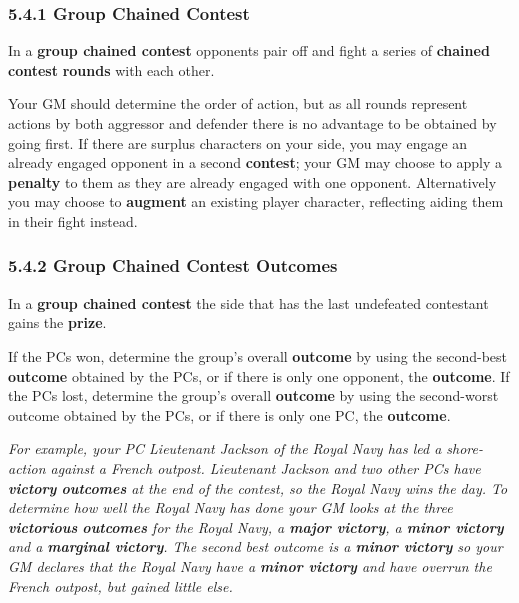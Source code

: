 \documentclass[
]{article}
\begin{document}
\hypertarget{group-chained-contest}{%
\subsubsection{5.4.1 Group Chained
Contest}\label{group-chained-contest}}

In a \textbf{group chained contest} opponents pair off and fight a
series of \textbf{chained contest} \textbf{rounds} with each other.

Your GM should determine the order of action, but as all rounds
represent actions by both aggressor and defender there is no advantage
to be obtained by going first. If there are surplus characters on your
side, you may engage an already engaged opponent in a second
\textbf{contest}; your GM may choose to apply a \textbf{penalty} to them
as they are already engaged with one opponent. Alternatively you may
choose to \textbf{augment} an existing player character, reflecting
aiding them in their fight instead.

\hypertarget{group-chained-contest-outcomes}{%
\subsubsection{5.4.2 Group Chained Contest
Outcomes}\label{group-chained-contest-outcomes}}

In a \textbf{group chained contest} the side that has the last
undefeated contestant gains the \textbf{prize}.

If the PCs won, determine the group's overall \textbf{outcome} by using
the second-best \textbf{outcome} obtained by the PCs, or if there is
only one opponent, the \textbf{outcome}. If the PCs lost, determine the
group's overall \textbf{outcome} by using the second-worst outcome
obtained by the PCs, or if there is only one PC, the \textbf{outcome}.

\emph{For example, your PC Lieutenant Jackson of the Royal Navy has led
a shore-action against a French outpost. Lieutenant Jackson and two
other PCs have \textbf{victory} \textbf{outcomes} at the end of the
contest, so the Royal Navy wins the day. To determine how well the Royal
Navy has done your GM looks at the three \textbf{victorious}
\textbf{outcomes} for the Royal Navy, a \textbf{major victory}, a
\textbf{minor victory} and a \textbf{marginal victory}. The second best
outcome is a \textbf{minor victory} so your GM declares that the Royal
Navy have a \textbf{minor victory} and have overrun the French outpost,
but gained little else.}
\end{document}
